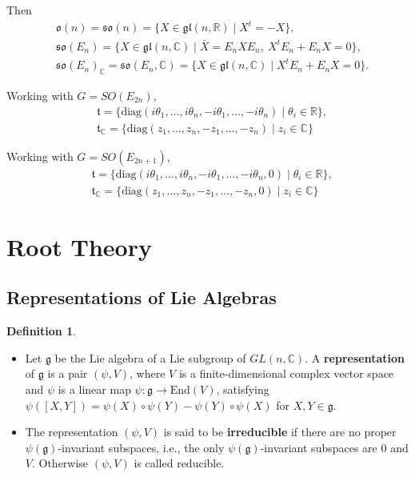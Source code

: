 \documentclass{article}
\theoremstyle{definition}
\newtheorem{definition}{Definition}[section]
\theoremstyle{plain}
\begin{document}
Then
\begin{align*}
    &\mathfrak{o}(n)=\mathfrak{so}(n)=\{X\in\mathfrak{gl}(n,\mathbb{R} )\mid X^t=-X\},\\
    & \mathfrak{so}(E_n)=\{X\in \mathfrak{gl}(n,\mathbb{C} )\mid \bar{X}=E_n X E_n,\ X^t E_n+E_n X=0\},\\
    & \mathfrak{so}(E_n)_{\mathbb{C} }=\mathfrak{so}(E_n,\mathbb{C} )=\{X\in \mathfrak{gl}(n,\mathbb{C} )\mid X^t E_n+E_n X=0\}.
\end{align*}

Working with $ G=SO(E_{2n}) $, 
\begin{align*}
    & \mathfrak{t}=\{\mathrm{diag}(i\theta_1,\dots,i\theta_n,-i\theta_1,\dots,-i\theta_n)\mid \theta_i\in \mathbb{R}\},\\
    & \mathfrak{t}_{\mathbb{C} }=\{\mathrm{diag}(z_1,\dots,z_n,-z_1,\dots,-z_n)\mid z_i\in \mathbb{C}\}
\end{align*}

Working with $ G=SO(E_{2n+1}) $,
\begin{align*}
        & \mathfrak{t}=\{\mathrm{diag}(i\theta_1,\dots,i\theta_n,-i\theta_1,\dots,-i\theta_n,0)\mid \theta_i\in \mathbb{R}\},\\
    & \mathfrak{t}_{\mathbb{C} }=\{\mathrm{diag}(z_1,\dots,z_n,-z_1,\dots,-z_n,0)\mid z_i\in \mathbb{C}\}
\end{align*}

\section{Root Theory}

\subsection{Representations of Lie Algebras}

\begin{definition}
    \begin{itemize}
        \item Let $ \mathfrak{g} $ be the Lie algebra of a Lie subgroup of $ GL(n,\mathbb{C}) $. A \textbf{representation} of $ \mathfrak{g} $ is a pair $ (\psi,V) $, where $ V $ is a finite-dimensional complex vector space and $ \psi $ is a linear map $ \psi: \mathfrak{g}\rightarrow \mathrm{End}(V) $, satisfying $ \psi([X,Y])=\psi(X)\circ\psi(Y)-\psi(Y)\circ\psi(X) $ for $ X, Y\in \mathfrak{g} $.
        \item The representation $ (\psi,V) $ is said to be \textbf{irreducible} if there are no proper $ \psi(\mathfrak{g}) $-invariant subspaces, i.e., the only $ \psi(\mathfrak{g}) $-invariant subspaces are $ {0} $ and $ V $. Otherwise $ (\psi,V) $ is called reducible.
    \end{itemize}
\end{definition}
\end{document}
